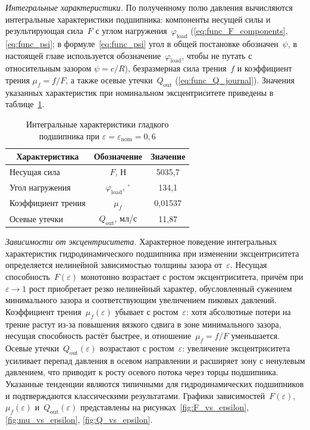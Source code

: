 \FloatBarrier

\textit{Интегральные характеристики.}
По полученному полю давления вычисляются интегральные
характеристики подшипника: компоненты несущей силы
и результирующая сила~$F$ с углом нагружения~$\varphi_{\mathrm{load}}$
(\eqref{eq:func_F_components}, \eqref{eq:func_psi}; в формуле~\eqref{eq:func_psi}
угол в общей постановке обозначен~$\psi$, в настоящей главе используется
обозначение~$\varphi_{\mathrm{load}}$, чтобы не путать с относительным
зазором $\psi = c/R$),
безразмерная сила трения~$f$ и коэффициент трения
$\mu_f = f/F$, а также осевые утечки~$Q_{\mathrm{out}}$
(\eqref{eq:func_Q_journal}). Значения указанных характеристик
при номинальном эксцентриситете приведены в
таблице~\ref{tab:smooth_results}.

\begin{table}[!ht]
\centering
\caption{Интегральные характеристики гладкого подшипника
  при $\varepsilon = \varepsilon_{\mathrm{nom}} = 0{,}6$}
\label{tab:smooth_results}
\begin{tabularx}{\textwidth}{|X|c|c|}
\hline
\multicolumn{1}{|c|}{\textbf{Характеристика}} & \textbf{Обозначение} & \textbf{Значение} \\
\hline
Несущая сила              & $F$, Н                        & 5035{,}7 \\
\hline
Угол нагружения           & $\varphi_{\mathrm{load}}$, $^{\circ}$ & 134{,}1 \\
\hline
Коэффициент трения        & $\mu_f$                       & 0{,}01537 \\
\hline
Осевые утечки             & $Q_{\mathrm{out}}$, мл/с      & 11{,}87 \\
\hline
\end{tabularx}
\end{table}

\FloatBarrier

\textit{Зависимости от эксцентриситета.}
Характерное поведение интегральных характеристик
гидродинамического подшипника при изменении эксцентриситета
определяется нелинейной зависимостью толщины зазора от~$\varepsilon$.
Несущая способность~$F(\varepsilon)$ монотонно возрастает
с ростом эксцентриситета, причём при $\varepsilon \to 1$
рост приобретает резко нелинейный характер, обусловленный
сужением минимального зазора и соответствующим увеличением
пиковых давлений. Коэффициент трения~$\mu_f(\varepsilon)$
убывает с ростом~$\varepsilon$: хотя абсолютные потери на трение
растут из-за повышения вязкого сдвига в зоне минимального зазора,
несущая способность растёт быстрее, и отношение~$\mu_f = f/F$
уменьшается. Осевые утечки~$Q_{\mathrm{out}}(\varepsilon)$
возрастают с ростом~$\varepsilon$: увеличение эксцентриситета
усиливает перепад давления в осевом направлении и расширяет зону
с ненулевым давлением, что приводит к росту осевого потока через
торцы подшипника. Указанные тенденции являются типичными
для гидродинамических подшипников и подтверждаются классическими
результатами. Графики зависимостей~$F(\varepsilon)$,
$\mu_f(\varepsilon)$ и~$Q_{\mathrm{out}}(\varepsilon)$ представлены
на рисунках~\ref{fig:F_vs_epsilon}, \ref{fig:mu_vs_epsilon},
\ref{fig:Q_vs_epsilon}.

